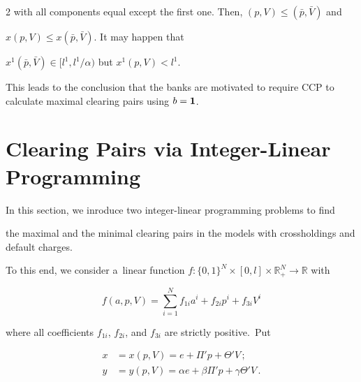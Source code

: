 \begin{multicols}{2}
with all components equal except the first one. Then, $(p,V)\le (\bar p,\bar V)$ and 

$x(p,V)\le x(\bar p,\bar V)$.  It may happen that 

$ x^1(\bar p, \bar V) \in [l^1, l^1/\alpha)$ but $x^1( p, V) <l^1$.  

This leads to the conclusion that the banks are motivated to require  CCP to calculate maximal  clearing pairs using $b={\bf 1}$. 





\vspace*{-4pt}



\section{Clearing Pairs via Integer-Linear Programming }



\vspace*{-4pt}



\noindent

In this section, we inroduce two integer-linear programming problems to find 

the maximal and  the minimal clearing pairs in the models with crossholdings and default charges. 

To this end, we consider a~linear function $f: \{ 0, 1 \}^N \times [0, l] \times 

\mathbb{R}^N_+ \to \mathbb{R}$ with 

$$

f(a, p, V) = \sum\limits_{i=1}^N f_{1i} a^i + f_{2i} p^i + f_{3i} V^i

$$

where all coefficients  $ f_{1i}$,  $f_{2i}$, and $f_{3i}$ are strictly positive.~Put 



\vspace*{-4pt}



\noindent

\begin{align*}

x &= x(p, V) = e + \Pi' p + \Theta' V\,; \\

 y &= y(p, V) = \alpha e + \beta \Pi' p + \gamma \Theta' V\,.

\end{align*}




\end{multicols}
